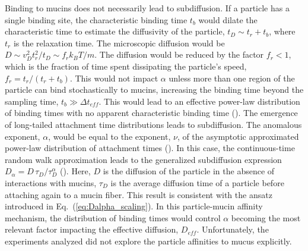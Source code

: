 \documentclass[aps,prl,preprint,superscriptaddress,showkeys,linenumbers]{revtex4-1}
\begin{document}
Binding to mucins does not necessarily lead to subdiffusion. If a particle has a single binding site, the characteristic binding time $t_b$ would dilate the characteristic time to estimate the diffusivity of the particle, $t_D \sim t_r + t_b$, where $t_r$ is the relaxation time. The microscopic diffusion would be $D \sim v_D^2 t_r^2 / t_D \sim f_r k_BT/m$. The diffusion would be reduced by the factor $f_r < 1$, which is the fraction of time spent dissipating the particle's speed, $f_r = t_r/(t_r + t_b)$. This would not impact $\alpha$ unless more than one region of the particle can bind stochastically to mucins, increasing the binding time beyond the sampling time, $t_b \gg \Delta t_{eff}$. This would lead to an effective power-law distribution of binding times with no apparent characteristic binding time (\cite{Xu2011PRL}). The emergence of long-tailed attachment time distributions leads to subdiffusion. The anomalous exponent, $\alpha$, would be equal to the exponent, $\nu$, of the asymptotic approximated power-law distribution of attachment times (\cite{Barkai2012PhysToday,Metzler2014,Kevin_2019}).
In this case, the continuous-time random walk approximation leads to the generalized subdiffusion expression $D_{\alpha} = D \, \tau_{D} / \tau_{D}^\alpha$ (\cite{Kevin_2019}). Here, $D$ is the diffusion of the particle in the absence of interactions with mucins, $\tau_D$ is the average diffusion time of a particle before attaching again to a mucin fiber. This result is consistent with the ansatz introduced in Eq.~(\ref{eq:Dalpha_scaling}). 
In this particle-mucin affinity mechanism, the distribution of binding times would control $\alpha$ becoming the most relevant factor impacting the effective diffusion, $D_{eff}$. Unfortunately, the experiments analyzed did not explore the particle affinities to mucus explicitly.
\end{document}
